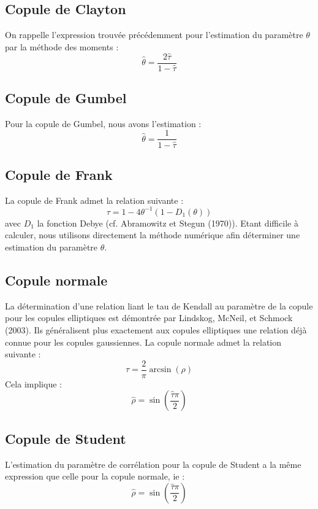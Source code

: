 \subsection{Copule de Clayton}

On rappelle l'expression trouvée précédemment pour l'estimation du paramètre $\theta$ par la méthode des moments :
$$
\widehat{\theta} = \frac{2 \widehat{\tau}}{1 - \widehat{\tau}}
$$

\subsection{Copule de Gumbel}

Pour la copule de Gumbel, nous avons l'estimation :
$$
\widehat{\theta} = \frac{1}{1-\widehat{\tau}}
$$

\subsection{Copule de Frank}

La copule de Frank admet la relation suivante :
$$
\tau = 1 - 4 \theta^{-1} (1-D_1(\theta))
$$
avec $D_1$ la fonction Debye (cf. Abramowitz et Stegun (1970)). Etant difficile à calculer, nous utilisons directement la méthode numérique 
afin déterminer une estimation du paramètre $\theta$.


\subsection{Copule normale}

La détermination d'une relation liant le tau de Kendall au paramètre de la copule pour les copules elliptiques est démontrée par Lindskog, McNeil,
et Schmock (2003). Ils généralisent plus exactement aux copules elliptiques une relation déjà connue
pour les copules gaussiennes. 
La copule normale admet la relation suivante :
$$
\tau = \frac{2}{\pi} \operatorname{arcsin}(\rho)
$$
Cela implique :
$$
\widehat{\rho} = \operatorname{sin}\left(\frac{\widehat{\tau} \pi}{2} \right)
$$


\subsection{Copule de Student}

L'estimation du paramètre de corrélation pour la copule de Student a la même expression que celle pour la copule normale, ie :
$$
\widehat{\rho} = \operatorname{sin}\left(\frac{\widehat{\tau} \pi}{2} \right)
$$

